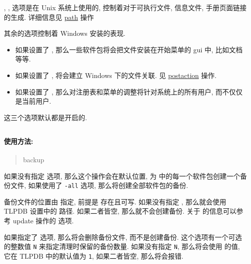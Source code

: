 , ,  选项是在 Unix 系统上使用的, 控制着对于可执行文件, 信息文件, 手册页面链接的生成. 详细信息见 \href{https://www.tug.org/texlive/doc/tlmgr.html#path}{path} 操作

其余的选项控制着 Windows 安装的表现. 
\begin{itemize}
    \item 如果设置了 , 那么一些软件包将会把文件安装在开始菜单的 \tlmgr{} \ac{gui} 中, 比如文档等等. 
    \item 如果设置了 , 将会建立 Windows 下的文件关联. 见 \href{https://www.tug.org/texlive/doc/tlmgr.html#postaction}{\ac{postaction}} 操作. 
    \item 如果设置了 , 那么对注册表和菜单的调整将针对系统上的所有用户, 而不仅仅是当前用户. 
\end{itemize}
这三个选项默认都是开启的. 

\clearpage

\subsection{}\label{subsec:backup}
\paragraph{使用方法:}

\begin{quote}
    \tlmgr{} \ac{backup} 
\end{quote}

如果没有指定  选项, 那么这个操作会在默认位置, 为  中的每一个软件包创建一个备份文件, 如果使用了 \texttt{-all} 选项, 那么将创建全部软件包的备份. 

备份文件的位置由   指定, 前提是  存在且可写. 如果没有指定 , 那么就会使用 TLPDB 设置中的  路径. 如果二者皆空, 那么就不会创建备份. 关于  的信息可以参考 \ac{update} 操作的 \hyperlink{op:backup}{} 选项. 

如果指定了  选项, 那么将会删除备份文件, 而不是创建备份. 这个选项有一个可选的整数值 \texttt{N} 来指定清理时保留的备份数量. 如果没有指定 \texttt{N}, 那么将会使用  的值, 它在 TLPDB 中的默认值为 \texttt{1}, 如果二者皆空, 那么将会报错. 


